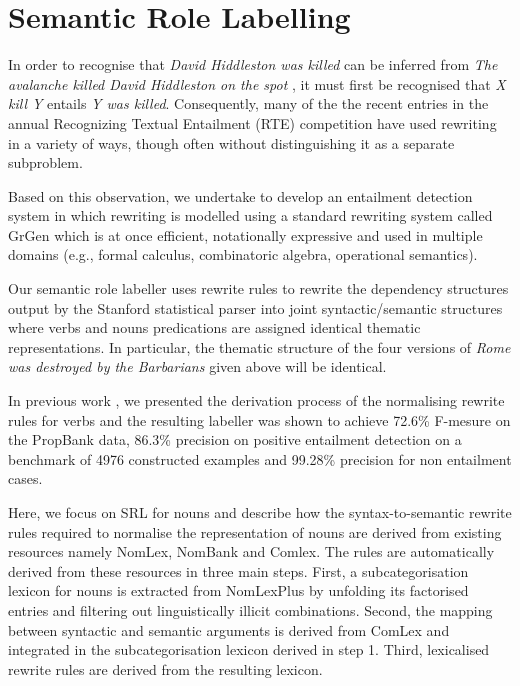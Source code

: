\documentclass[twocolumn,10pt]{article}
\renewcommand\cite{\citep}
\begin{document}
\section{Semantic Role Labelling}
\label{sec:srl}

In order to recognise that {\it David Hiddleston was killed} can be
inferred from {\it The avalanche killed David Hiddleston on the
  spot }, it must first be recognised that {\it X kill Y} entails {\it Y was
  killed}. Consequently, many of the the recent entries in the annual
Recognizing Textual Entailment (RTE) competition have used rewriting
in a variety of ways, though often without distinguishing it as a
separate subproblem.

Based on this observation, we undertake to develop an entailment
detection system in which rewriting is modelled using a standard
rewriting system called GrGen \cite{grgen} which is at once efficient,
notationally expressive and used in multiple domains (e.g., formal
calculus, combinatoric algebra, operational semantics).

Our semantic role labeller uses rewrite rules to rewrite the
dependency structures output by the Stanford statistical parser into
joint syntactic/semantic structures where verbs and nouns predications
are assigned identical thematic representations. In particular, the
thematic structure of the four versions of {\it Rome was destroyed by
  the Barbarians} given above will be identical.


In previous work \cite{bedgariwcs09}, we presented the derivation process of
the normalising rewrite rules for verbs and the resulting labeller was
shown to achieve 72.6\% F-mesure on the PropBank data, 86.3\%
precision on positive entailment detection on a benchmark of 4976
constructed examples and 99.28\% precision for non entailment cases.

Here, we focus on SRL for nouns and describe how the
syntax-to-semantic rewrite rules required to normalise the
representation of nouns are derived from existing resources namely
NomLex, NomBank and Comlex. The rules are automatically derived from
these resources in three main steps.
First, a subcategorisation lexicon for nouns is extracted from
NomLexPlus by unfolding its factorised entries and filtering out
linguistically illicit combinations.
Second, the mapping between syntactic and semantic arguments is
derived from ComLex and integrated in the subcategorisation lexicon
derived in step 1.
Third, lexicalised rewrite rules are derived from the resulting
lexicon. 
\end{document}
